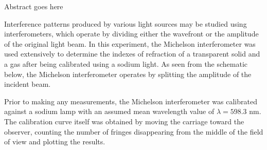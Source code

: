 
\physics

\paperdate{}
\begin{paperabs}
	
	Abstract goes here
	
\end{paperabs}
	
\begin{paper}
	
	
	Interference patterns produced by various light sources may be studied using interferometers, which operate by dividing either the wavefront or the amplitude of the original light beam. In this experiment, the Michelson interferometer was used extensively to determine the indexes of refraction of a transparent solid and a gas after being calibrated using a sodium light. As seen from the schematic below, the Michelson interferometer operates by splitting the amplitude of the incident beam. 
	
	
	Prior to making any measurements, the Michelson interferometer was calibrated against a sodium lamp with an assumed mean wavelength value of \( \lambda = 598.3 \) \si{nm}. The calibration curve itself was obtained by moving the carriage toward the observer, counting the number of fringes disappearing from the middle of the field of view and plotting the results. 
	

\end{paper}
